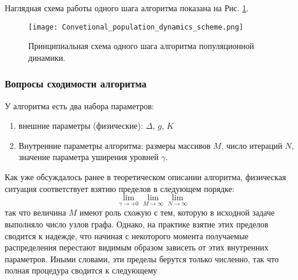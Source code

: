 Наглядная схема работы одного шага алгоритма показана на Рис. \ref{fig:Population_dynamics_algorythm_scheme}.
\begin{figure}[h]
	\label{fig:Population_dynamics_algorythm_scheme}
	\centering
	\texttt{[image: Convetional\_population\_dynamics\_scheme.png]}
	\caption{Принципиальная схема одного шага алгоритма популяционной динамики.}
\end{figure}

\subsubsection{Вопросы сходимости алгоритма}
У алгоритма есть два набора параметров:
\begin{enumerate}
	\item внешние параметры (физические): $\Delta$, $g$, $K$
	\item Внутренние параметры алгоритма: размеры массивов $M$, число итераций $N$, значение параметра уширения уровней $\gamma$. 
\end{enumerate}
Как уже обсуждалось ранее в теоретическом описании алгоритма, физическая ситуация соответствует взятию пределов в следующем порядке:
$$
\lim_{\gamma \rightarrow +0} \lim_{M \rightarrow \infty} \lim_{N \rightarrow \infty}
$$
так что величина $M$ имеют роль схожую с тем, которую в исходной задаче выполняло число узлов графа. Однако, на практике взятие этих пределов сводится к надежде, что начиная с некоторого момента получаемые распределения перестают видимым образом зависеть от этих внутренних параметров. Иными словами, эти пределы берутся только численно, так что полная процедура сводится к следующему
